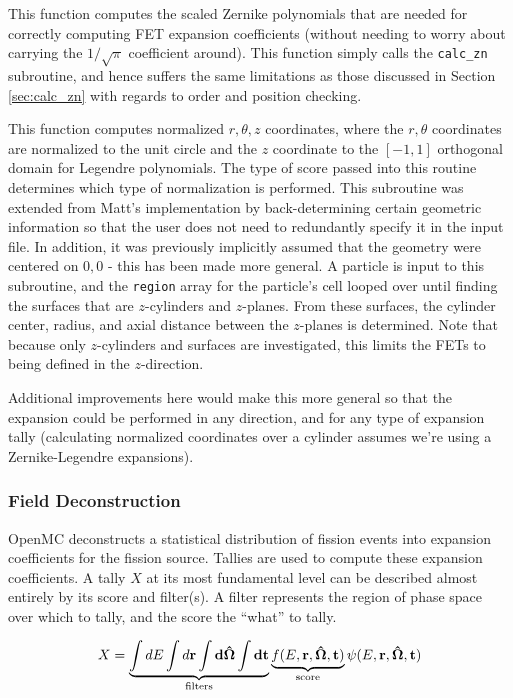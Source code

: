 \documentclass[10pt]{article}
\newcommand{\beq}{\begin{equation}}
\newcommand{\eeq}{\end{equation}}
\newcounter{subsubsubsection}[subsubsection]
\numberwithin{equation}{section} %
\begin{document}
This function computes the scaled Zernike polynomials that are needed for correctly computing FET expansion coefficients (without needing to worry about carrying the \(1/\sqrt{\pi}\) coefficient around). This function simply calls the {\tt calc\_zn} subroutine, and hence suffers the same limitations as those discussed in Section \ref{sec:calc_zn} with regards to order and position checking.

This function computes normalized \(r, \theta, z\) coordinates, where the \(r, \theta\) coordinates are normalized to the unit circle and the \(z\) coordinate to the \([-1, 1]\) orthogonal domain for Legendre polynomials. The type of score passed into this routine determines which type of normalization is performed. This subroutine was extended from Matt's implementation by back-determining certain geometric information so that the user does not need to redundantly specify it in the input file. In addition, it was previously implicitly assumed that the geometry were centered on \(0, 0\) - this has been made more general. A particle is input to this subroutine, and the {\tt region} array for the particle's cell looped over until finding the surfaces that are \(z\)-cylinders and \(z\)-planes. From these surfaces, the cylinder center, radius, and axial distance between the \(z\)-planes is determined. Note that because only \(z\)-cylinders and surfaces are investigated, this limits the FETs to being defined in the \(z\)-direction. 

\color{magenta}
Additional improvements here would make this more general so that the expansion could be performed in any direction, and for any type of expansion tally (calculating normalized coordinates over a cylinder assumes we're using a Zernike-Legendre expansions).
\color{black}

\subsubsection{Field Deconstruction}
OpenMC deconstructs a statistical distribution of fission events into expansion coefficients for the fission source. Tallies are used to compute these expansion coefficients. A tally \(X\) at its most fundamental level can be described almost entirely by its score and filter(s). A filter represents the region of phase space over which to tally, and the score the ``what'' to tally. 

\beq
X=\underbrace{\int dE\int d\bf{r}\int d\hat{\Omega}\int dt}_{\textrm{filters}} \underbrace{f(E,\bf{r},\hat{\Omega},t)}_{\textrm{score}}\psi(E,\bf{r},\hat{\Omega},t)
\eeq
\end{document}

